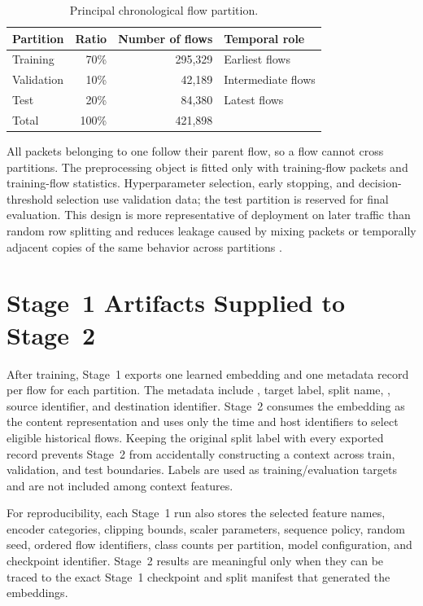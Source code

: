 \documentclass[11pt,fleqn]{report}
\begin{document}
\begin{table}[H]
    \centering
    \caption{Principal chronological flow partition.}
    \label{tab:chronological_split}
    \begin{tabular}{@{}lrrl@{}}
        \toprule
        Partition & Ratio & Number of flows & Temporal role \\
        \midrule
        Training & 70\% & 295,329 & Earliest flows \\
        Validation & 10\% & 42,189 & Intermediate flows \\
        Test & 20\% & 84,380 & Latest flows \\
        \midrule
        Total & 100\% & 421,898 & \\
        \bottomrule
    \end{tabular}
\end{table}

All packets belonging to one  follow their parent flow,
so a flow cannot cross partitions. The preprocessing object is fitted only
with training-flow packets and training-flow statistics. Hyperparameter
selection, early stopping, and decision-threshold selection use validation
data; the test partition is reserved for final evaluation. This design is more
representative of deployment on later traffic than random row splitting and
reduces leakage caused by mixing packets or temporally adjacent copies of the
same behavior across partitions \cite{SommerPaxson2010,Arp2022DosDonts}.

\section{Stage~1 Artifacts Supplied to Stage~2}
\label{subsec:stage2_artifacts}

After training, Stage~1 exports one learned embedding and one metadata record
per flow for each partition. The metadata include
, target label, split name,
, source identifier, and destination
identifier. Stage~2 consumes the embedding as the content representation and
uses only the time and host identifiers to select eligible historical flows.
Keeping the original split label with every exported record prevents Stage~2
from accidentally constructing a context across train, validation, and test
boundaries. Labels are used as training/evaluation targets and are not included
among context features.

For reproducibility, each Stage~1 run also stores the selected feature names,
encoder categories, clipping bounds, scaler parameters, sequence policy,
random seed, ordered flow identifiers, class counts per partition, model
configuration, and checkpoint identifier. Stage~2 results are meaningful only
when they can be traced to the exact Stage~1 checkpoint and split manifest that
generated the embeddings.
\end{document}
